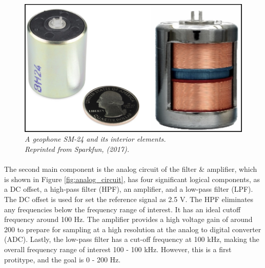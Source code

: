 \begin{figure}[H]
  \centering
  \caption[A geophone SM-24 and its interior elements.]{\emph{A geophone SM-24 and its interior elements. \\Reprinted from Sparkfun, (2017). }}\label{fig:seismic}
  \includegraphics[scale = 0.25]{figures/seismic.jpg}  
\end{figure}

\paragraph{}
The second main component is the analog circuit of the filter \& amplifier, which is shown in Figure \ref{fig:analog_circuit}, has four significant logical components, as a DC offset, a high-pass filter (HPF), an amplifier, and a low-pass filter (LPF). The DC offset is used for set the reference signal as 2.5 V. The HPF eliminates any frequencies below the frequency range of interest. It has an ideal cutoff frequency around 100 Hz. The amplifier provides a high voltage gain of around 200 to prepare for sampling at a high resolution at the analog to digital converter (ADC). Lastly, the low-pass filter has a cut-off frequency at 100 kHz, making the overall frequency range of interest 100 - 100 kHz. However, this is a first protitype, and the goal is 0 - 200 Hz.

